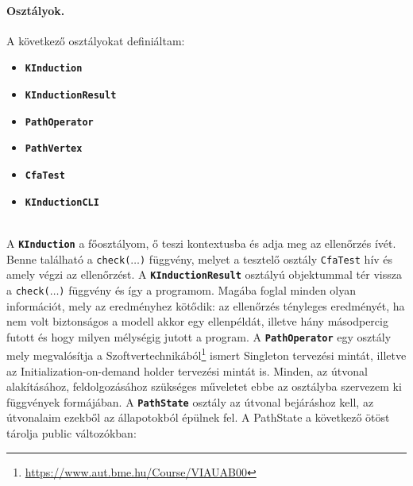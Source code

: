 \paragraph{Osztályok.}
A következő osztályokat definiáltam:

\begin{itemize}
	\item \textbf{\texttt{KInduction}}
	\item \textbf{\texttt{KInductionResult}}
	\item \textbf{\texttt{PathOperator}}
	\item \textbf{\texttt{PathVertex}}
	\item \textbf{\texttt{CfaTest}}
	\item \textbf{\texttt{KInductionCLI}}
\end{itemize}
\ \\
A \textbf{\texttt{KInduction}} a főosztályom, ő teszi kontextusba és adja meg az ellenőrzés ívét. Benne található a \texttt{check($ \ldots $)} függvény, melyet a tesztelő osztály \texttt{CfaTest} hív és amely végzi az ellenőrzést.
\newline
\newline
A \textbf{\texttt{KInductionResult}} osztályú objektummal tér vissza a \texttt{check($ \ldots $)} függvény és így a programom. Magába foglal minden olyan információt, mely az eredményhez kötődik: az ellenőrzés tényleges eredményét, ha nem volt biztonságos a modell akkor egy ellenpéldát, illetve hány másodpercig futott és hogy milyen mélységig jutott a program.
\newline
\newline
A \textbf{\texttt{PathOperator}} egy osztály mely megvalósítja a Szoftvertechnikából\footnote{\url{https://www.aut.bme.hu/Course/VIAUAB00}} ismert Singleton tervezési mintát, illetve az Initialization-on-demand holder \cite{design_pattern_lazy_holder} tervezési mintát is. Minden, az útvonal alakításához, feldolgozásához szükséges műveletet ebbe az osztályba szervezem ki függvények formájában. 
\newline
\newline
A \textbf{\texttt{PathState}} osztály az útvonal bejáráshoz kell, az útvonalaim ezekből az állapotokból épülnek fel. A PathState a következő ötöst tárolja public változókban:

